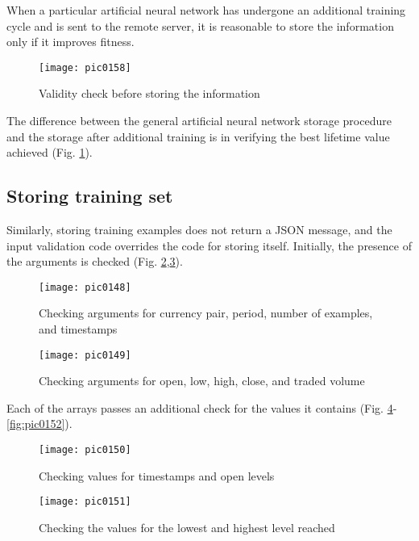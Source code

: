 When a particular artificial neural network has undergone an additional training cycle and is sent to the remote server, it is reasonable to store the information only if it improves fitness.

\begin{figure}[h]
\centering
\texttt{[image: pic0158]}
\caption{Validity check before storing the information}
\label{fig:pic0158}
\end{figure}
\FloatBarrier

The difference between the general artificial neural network storage procedure and the storage after additional training is in verifying the best lifetime value achieved (Fig. \ref{fig:pic0158}).

\subsection{Storing training set}

Similarly, storing training examples does not return a JSON message, and the input validation code overrides the code for storing itself. Initially, the presence of the arguments is checked (Fig. \ref{fig:pic0148},\ref{fig:pic0149}).

\begin{figure}[h]
\centering
\texttt{[image: pic0148]}
\caption{Checking arguments for currency pair, period, number of examples, and timestamps}
\label{fig:pic0148}
\end{figure}
\FloatBarrier

\begin{figure}[h]
\centering
\texttt{[image: pic0149]}
\caption{Checking arguments for open, low, high, close, and traded volume}
\label{fig:pic0149}
\end{figure}
\FloatBarrier

Each of the arrays passes an additional check for the values it contains (Fig. \ref{fig:pic0150}-\ref{fig:pic0152}).

\begin{figure}[h]
\centering
\texttt{[image: pic0150]}
\caption{Checking values for timestamps and open levels}
\label{fig:pic0150}
\end{figure}
\FloatBarrier

\begin{figure}[h]
\centering
\texttt{[image: pic0151]}
\caption{Checking the values for the lowest and highest level reached}
\label{fig:pic0151}
\end{figure}
\FloatBarrier


